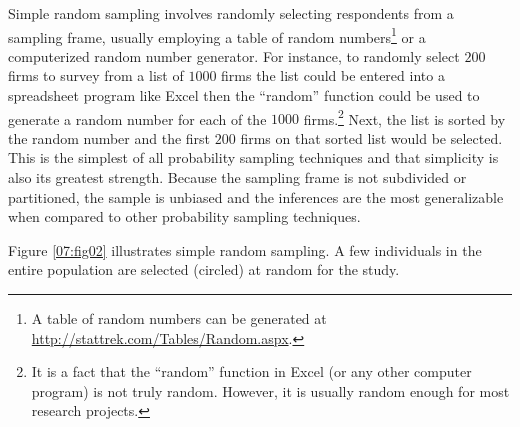 Simple random sampling involves randomly selecting respondents from a sampling frame, usually employing a table of random numbers\footnote{A table of random numbers can be generated at \url{http://stattrek.com/Tables/Random.aspx}.} or a computerized random number generator. For instance, to randomly select $ 200 $ firms to survey from a list of $ 1000 $ firms the list could be entered into a spreadsheet program like Excel then the ``random'' function could be used to generate a random number for each of the $ 1000 $ firms.\footnote{It is a fact that the ``random'' function in Excel (or any other computer program) is not truly random. However, it is usually random enough for most research projects.} Next, the list is sorted by the random number and the first $ 200 $ firms on that sorted list would be selected. This is the simplest of all probability sampling techniques and that simplicity is also its greatest strength. Because the sampling frame is not subdivided or partitioned, the sample is unbiased and the inferences are the most generalizable when compared to other probability sampling techniques.

Figure \ref{07:fig02} illustrates simple random sampling. A few individuals in the entire population are selected (circled) at random for the study.

